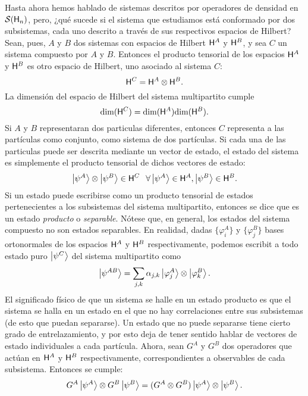 Hasta ahora hemos hablado de sistemas descritos por operadores de densidad en $\mathcal{S}({\sf H}_{n})$, pero, ¿qué sucede si el sistema que estudiamos está conformado por dos subsistemas, cada uno descrito a través de sus respectivos espacios de Hilbert? Sean, pues, $A$ y $B$ dos sistemas con espacios de Hilbert ${\sf H}^{A}$ y ${\sf H}^{B}$, y sea $C$ un sistema compuesto por $A$ y $B$. Entonces el producto tensorial de los espacios ${\sf H}^{A}$ y ${\sf H}^{B}$ es otro espacio de Hilbert, uno asociado al sistema $C$:
 \begin{equation*}
     {\sf H}^{C}={\sf H}^{A}\otimes{\sf H}^{B}.
 \end{equation*}
 La dimensión del espacio de Hilbert del sistema multipartito cumple
\begin{equation*}
    \text{dim}({\sf H}^{C})=\text{dim}({\sf H}^{A})\text{dim}({\sf H}^{B}).
\end{equation*}
Si $A$ y $B$ representaran dos particulas diferentes, entonces $C$ representa a las partículas como conjunto, como sistema de dos partículas. Si cada una de las particulas puede ser descrita mediante un vector de estado, el estado del sistema es simplemente el producto tensorial de dichos vectores de estado:
\begin{equation*}
    \ket{\psi^{A}}\otimes\ket{\psi^{B}}\in{\sf H}^{C}\,\; \; \forall\ket{\psi^{A}}\in{\sf H}^{A},\ket{\psi^{B}}\in{\sf H}^{B}.
\end{equation*}
Si un estado puede escribirse como un producto tensorial de estados pertenecientes a los subsistemas del sistema multipartito, entonces se dice que es un estado \textit{producto} o \textit{separable}. Nótese que, en general, los estados del sistema compuesto no son estados separables. En realidad, dadas $\{\varphi_{i}^{A}\}$ y $\{\varphi_{j}^{B}\}$ bases ortonormales de los espacios ${\sf H}^{A}$ y ${\sf H}^{B}$ respectivamente, podemos escribit a todo estado puro $\ket{\psi^{C}}$ del sistema multipartito como
\begin{equation*}
    \ket{\psi^{AB}}=\sum_{j,k}\alpha_{j,k}\ket{\varphi_{j}^{A}}\otimes\ket{\varphi_{k}^{B}}.
\end{equation*}
El significado físico de que un sistema se halle en un estado producto es que el sistema se halla en un estado en el que no hay correlaciones entre sus subsistemas (de esto que puedan separarse). Un estado que no puede separarse tiene cierto grado de entrelazamiento, y por esto deja de tener sentido hablar de vectores de estado individuales a cada partícula. Ahora, sean $G^{A}$ y $G^{B}$ dos operadores que actúan en ${\sf H}^{A}$ y ${\sf H}^{B}$ respectivamente, correspondientes a observables de cada subsistema. Entonces se cumple:
\begin{equation*}
    G^{A}\ket{\psi^{A}}\otimes G^{B}\ket{\psi^{B}}=(G^{A}\otimes G^{B})\ket{\psi^{A}}\otimes\ket{\psi^{B}}.
\end{equation*}

